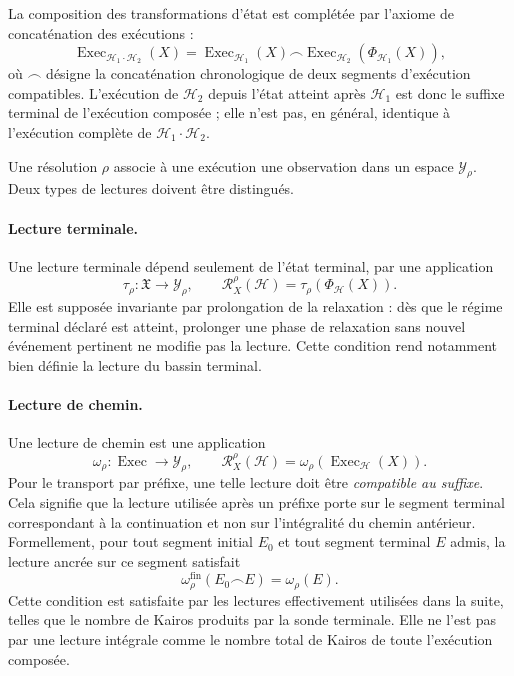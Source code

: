 La composition des transformations d'état est complétée par l'axiome de
concaténation des exécutions :
\begin{equation}
\label{eq:annexe-G-concatenation-executions}
\boxed{
\operatorname{Exec}_{\mathcal H_1\cdot\mathcal H_2}(X)
=
\operatorname{Exec}_{\mathcal H_1}(X)
\frown
\operatorname{Exec}_{\mathcal H_2}
\!\left(\Phi_{\mathcal H_1}(X)\right),
}
\end{equation}
où \(\frown\) désigne la concaténation chronologique de deux segments
d'exécution compatibles. L'exécution de \(\mathcal H_2\) depuis l'état
atteint après \(\mathcal H_1\) est donc le suffixe terminal de
l'exécution composée ; elle n'est pas, en général, identique à
l'exécution complète de \(\mathcal H_1\cdot\mathcal H_2\).

Une résolution \(\rho\) associe à une exécution une observation dans un
espace \(\mathcal Y_\rho\). Deux types de lectures doivent être
distingués.

\paragraph{Lecture terminale.}
Une lecture terminale dépend seulement de l'état terminal, par une
application
\[
\tau_\rho:\mathfrak X\longrightarrow\mathcal Y_\rho,
\qquad
\mathcal R_X^\rho(\mathcal H)
=
\tau_\rho\!\left(\Phi_{\mathcal H}(X)\right).
\]
Elle est supposée invariante par prolongation de la relaxation : dès que
le régime terminal déclaré est atteint, prolonger une phase de
relaxation sans nouvel événement pertinent ne modifie pas la lecture.
Cette condition rend notamment bien définie la lecture du bassin
terminal.

\paragraph{Lecture de chemin.}
Une lecture de chemin est une application
\[
\omega_\rho:\operatorname{Exec}\longrightarrow\mathcal Y_\rho,
\qquad
\mathcal R_X^\rho(\mathcal H)
=
\omega_\rho\!\left(\operatorname{Exec}_{\mathcal H}(X)\right).
\]
Pour le transport par préfixe, une telle lecture doit être
\emph{compatible au suffixe}. Cela signifie que la lecture utilisée
après un préfixe porte sur le segment terminal correspondant à la
continuation et non sur l'intégralité du chemin antérieur. Formellement,
pour tout segment initial \(E_0\) et tout segment terminal \(E\) admis,
la lecture ancrée sur ce segment satisfait
\begin{equation}
\label{eq:annexe-G-compatibilite-suffixe}
\omega_\rho^{\mathrm{fin}}(E_0\frown E)
=
\omega_\rho(E).
\end{equation}
Cette condition est satisfaite par les lectures effectivement utilisées
dans la suite, telles que le nombre de Kairos produits par la sonde
terminale. Elle ne l'est pas par une lecture intégrale comme le nombre
total de Kairos de toute l'exécution composée.

